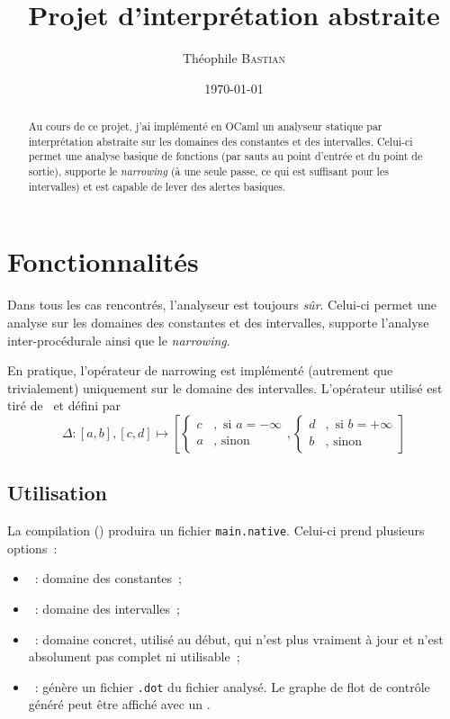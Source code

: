 \documentclass[11pt,a4paper]{article}
\author{Théophile \textsc{Bastian}}
\title{Projet d'interprétation abstraite}
\date{\today}
\begin{document}
\maketitle

\begin{abstract}
	Au cours de ce projet, j'ai implémenté en OCaml un analyseur statique
	par interprétation abstraite sur les domaines des constantes et
	des intervalles. Celui-ci permet une analyse basique de fonctions
	(par sauts au point d'entrée et du point de sortie), supporte le
	\textit{narrowing} (à une seule passe, ce qui est suffisant pour
	les intervalles) et est capable de lever des alertes basiques.
\end{abstract}

\section{Fonctionnalités}
Dans tous les cas rencontrés, l'analyseur est toujours \emph{sûr}. Celui-ci
permet une analyse sur les domaines des constantes et des intervalles, supporte
l'analyse inter-procédurale ainsi que le \textit{narrowing}.

En pratique, l'opérateur de narrowing est implémenté (autrement que
trivialement) uniquement sur le domaine des intervalles. L'opérateur utilisé
est tiré de~\cite{cousotWiden} et défini par
\[
	\Delta : [a,b], [c,d] \mapsto [
		\begin{cases}c&,\text{~si } a = -\infty\\
			a&,\text{~sinon} \end{cases},
		\begin{cases}d&,\text{~si } b = +\infty\\
			b&,\text{~sinon} \end{cases}
		]
\]		

\subsection{Utilisation}

La compilation () produira un fichier \texttt{main.native}.
Celui-ci prend plusieurs options~:
\begin{itemize}
	\item {}~: domaine des constantes~;
	\item {}~: domaine des intervalles~;
	\item {}~: domaine concret, utilisé au début, qui n'est
		plus vraiment à jour et n'est absolument pas complet ni utilisable~;
	\item {}~: génère un fichier \texttt{.dot} du fichier analysé.
		Le graphe de flot de contrôle généré peut être affiché avec un
		.
\end{itemize}
\end{document}
